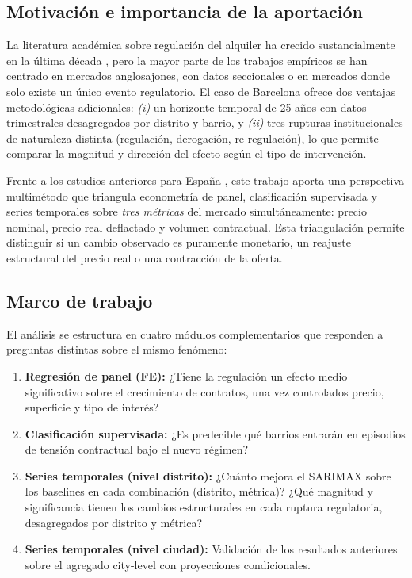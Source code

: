 \documentclass[12pt,a4paper]{article}
\begin{document}
\subsection*{Motivación e importancia de la aportación}

La literatura académica sobre regulación del alquiler ha crecido sustancialmente en la
última década \citep{diamond2019rent, sims2007rent}, pero la mayor parte de los trabajos
empíricos se han centrado en mercados anglosajones, con datos seccionales o en mercados
donde solo existe un único evento regulatorio. El caso de Barcelona ofrece dos ventajas
metodológicas adicionales: \textit{(i)} un horizonte temporal de 25 años con datos
trimestrales desagregados por distrito y barrio, y \textit{(ii)} tres rupturas
institucionales de naturaleza distinta (regulación, derogación, re-regulación), lo que
permite comparar la magnitud y dirección del efecto según el tipo de intervención.

Frente a los estudios anteriores para España \citep{garcia2018housing, modenes2021alquiler},
este trabajo aporta una perspectiva multimétodo que triangula econometría de panel,
clasificación supervisada y series temporales sobre \emph{tres métricas} del mercado
simultáneamente: precio nominal, precio real deflactado y volumen contractual. Esta
triangulación permite distinguir si un cambio observado es puramente monetario, un
reajuste estructural del precio real o una contracción de la oferta.

\subsection*{Marco de trabajo}

El análisis se estructura en cuatro módulos complementarios que responden a preguntas
distintas sobre el mismo fenómeno:

\begin{enumerate}[leftmargin=*, label=\textbf{M\arabic*.}]
  \item \textbf{Regresión de panel (FE):} ¿Tiene la regulación un efecto medio
    significativo sobre el crecimiento de contratos, una vez controlados precio,
    superficie y tipo de interés?
  \item \textbf{Clasificación supervisada:} ¿Es predecible qué barrios entrarán
    en episodios de tensión contractual bajo el nuevo régimen?
  \item \textbf{Series temporales (nivel distrito):} ¿Cuánto mejora el SARIMAX
    sobre los baselines en cada combinación (distrito, métrica)?
    ¿Qué magnitud y significancia tienen los cambios estructurales en cada
    ruptura regulatoria, desagregados por distrito y métrica?
  \item \textbf{Series temporales (nivel ciudad):} Validación de los resultados
    anteriores sobre el agregado city-level con proyecciones condicionales.
\end{enumerate}
\end{document}
